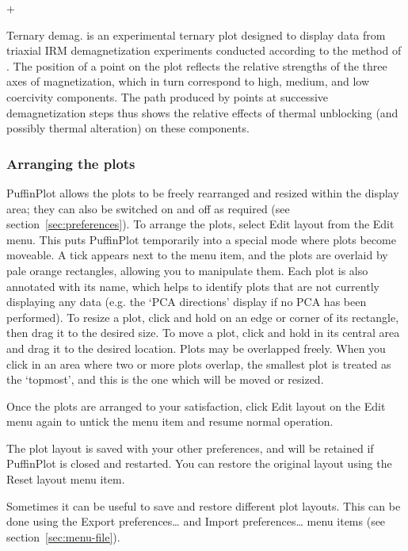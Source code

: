 \documentclass[a4paper,british]{article}
\newcommand{\menuitemlabel}[1]{%
\mbox{\textsf{#1}}\hfil}
\newenvironment{menuitemlist}%
{\begin{list}{}{%
\renewcommand{\makelabel}{\menuitemlabel}%
\setlength{\labelwidth}{35pt}%
\setlength{\leftmargin}%
             {\labelwidth+\labelsep}}}%
{\end{list}}
\newcommand{\ppcmd}[1]{\textsf{#1}} %
\newcommand{\caps}[1]{\MakeTextUppercase{#1}} %
\begin{document}
\begin{menuitemlist}
\item[Ternary demag.] is an experimental ternary plot designed to
  display data from triaxial \caps{irm} demagnetization experiments
  conducted according to the method of \cite{lowrie1990identification}.
  The position of a point on the plot reflects the relative strengths of
  the three axes of magnetization, which in turn correspond to high,
  medium, and low coercivity components. The path produced by points at
  successive demagnetization steps thus shows the relative effects of
  thermal unblocking (and possibly thermal alteration) on these
  components.

\end{menuitemlist}

\subsubsection{\label{sec:edit-layout}Arranging the plots}

PuffinPlot allows the plots to be freely rearranged and resized within the
display area; they can also be switched on and off as required (see
section~\ref{sec:preferences}). To arrange the plots, select \ppcmd{Edit
  layout} from the \ppcmd{Edit} menu. This puts PuffinPlot temporarily into a
special mode where plots become moveable. A tick appears next to the menu
item, and the plots are overlaid by pale orange rectangles, allowing you to
manipulate them. Each plot is also annotated with its name, which helps to
identify plots that are not currently displaying any data (e.g. the
`\caps{pca} directions' display if no \caps{pca} has been performed). To
resize a plot, click and hold on an edge or corner of its rectangle, then
drag it to the desired size. To move a plot, click and hold in its central
area and drag it to the desired location. Plots may be overlapped freely.
When you click in an area where two or more plots overlap, the smallest plot
is treated as the `topmost', and this is the one which will be moved or
resized.

Once the plots are arranged to your satisfaction, click \ppcmd{Edit layout} on
the \ppcmd{Edit} menu again to untick the menu item and resume normal
operation.

The plot layout is saved with your other preferences, and will be retained
if PuffinPlot is closed and restarted. You can restore the original
layout using the \ppcmd{Reset layout} menu item.

Sometimes it can be useful to save and restore different plot layouts. This
can be done using the \ppcmd{Export preferences…} and \ppcmd{Import
  preferences…} menu items (see section~\ref{sec:menu-file}).
\end{document}
